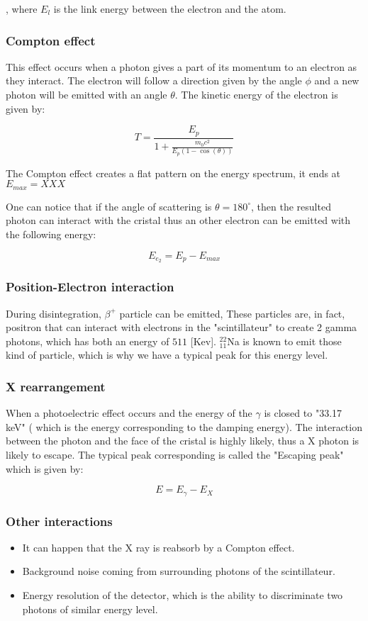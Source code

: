 \documentclass[a4paper,12pt,oneside]{article}
\begin{document}
, where $E_l$ is the link energy between the electron and the atom.

\subsubsection{Compton effect}
This effect occurs when a photon gives a part of its momentum to an 
electron as they interact. The electron will follow a direction given 
by the angle $\phi$ and a new photon will be emitted with an angle $\theta$.
The kinetic energy of the electron is given by:

$$T=\frac{E_p}{1+\frac{m_0c^2}{E_p(1-\cos(\theta))}}$$

The Compton effect creates a flat pattern on the energy spectrum, it ends at $E_{max}=XXX$%

One can notice that if the angle of scattering is $\theta=180^{\circ}$, then the resulted photon can interact with the cristal thus an other electron can be emitted with the following energy:

$$E_{e_2}=E_p-E_{max}$$

\subsubsection{Position-Electron interaction}
During disintegration, $\beta^+$ particle can be emitted, These 
particles are, in fact, positron that can interact with electrons in 
the "scintillateur" to create 2 gamma photons, which has both an energy of $511$ [Kev].
$^{22}_{11}$Na is known to emit those kind of particle, which is why we have a typical peak for this energy level.

\subsubsection{X rearrangement}%
When a photoelectric effect occurs and the energy of the $\gamma$ is closed to "33.17 keV" ( which is the energy corresponding to the damping energy). The interaction between the photon and the face of the cristal is highly likely, thus a X photon is likely to escape. The typical peak corresponding is called the "Escaping peak" which is given by:

$$E=E_{\gamma}-E_{X}$$

\subsubsection{Other interactions}
\begin{itemize}
\item It can happen that the X ray is reabsorb by a Compton effect.
\item Background noise coming from surrounding photons of the scintillateur.
\item Energy resolution of the detector, which is the ability to discriminate two photons of similar energy level.
\end{itemize}
\end{document}
